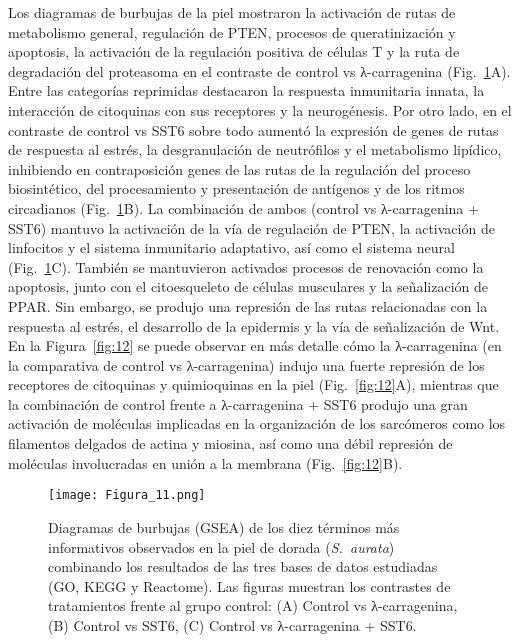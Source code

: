 \documentclass[10pt,a4paper]{article}
\begin{document}
Los diagramas de burbujas de la piel mostraron la activación de rutas de metabolismo general, regulación de PTEN, procesos de queratinización y apoptosis, la activación de la regulación positiva de células T y la ruta de degradación del proteasoma en el contraste de control vs λ-carragenina (Fig.~\ref{fig:11}A). Entre las categorías reprimidas destacaron la respuesta inmunitaria innata, la interacción de citoquinas con sus receptores y la neurogénesis. Por otro lado, en el contraste de control vs SST6 sobre todo aumentó la expresión de genes de rutas de respuesta al estrés, la desgranulación de neutrófilos y el metabolismo lipídico, inhibiendo en contraposición genes de las rutas de la regulación del proceso biosintético, del procesamiento y presentación de antígenos y de los ritmos circadianos (Fig.~\ref{fig:11}B). La combinación de ambos (control vs λ-carragenina + SST6) mantuvo la activación de la vía de regulación de PTEN, la activación de linfocitos y el sistema inmunitario adaptativo, así como el sistema neural (Fig.~\ref{fig:11}C). También se mantuvieron activados procesos de renovación como la apoptosis, junto con el citoesqueleto de células musculares y la señalización de PPAR. Sin embargo, se produjo una represión de las rutas relacionadas con la respuesta al estrés, el desarrollo de la epidermis y la vía de señalización de Wnt. En la Figura~\ref{fig:12} se puede observar en más detalle cómo la λ-carragenina (en la comparativa de control vs λ-carragenina) indujo una fuerte represión de los receptores de citoquinas y quimioquinas en la piel (Fig.~\ref{fig:12}A), mientras que la combinación de control frente a λ-carragenina + SST6 produjo una gran activación de moléculas implicadas en la organización de los sarcómeros como los filamentos delgados de actina y miosina, así como una débil represión de moléculas involucradas en unión a la membrana (Fig.~\ref{fig:12}B).

\begin{figure}[p]                 %
  \centering
  \texttt{[image: Figura\_11.png]}
  \caption{Diagramas de burbujas (GSEA) de los diez términos más informativos observados en la piel de dorada (\textit{S.\ aurata}) combinando los resultados de las tres bases de datos estudiadas (GO, KEGG y Reactome). Las figuras muestran los contrastes de tratamientos frente al grupo control: (A) Control vs λ-carragenina, (B) Control vs SST6, (C) Control vs λ-carragenina + SST6.}

  \label{fig:11}
\end{figure}
\clearpage                          %
\end{document}
